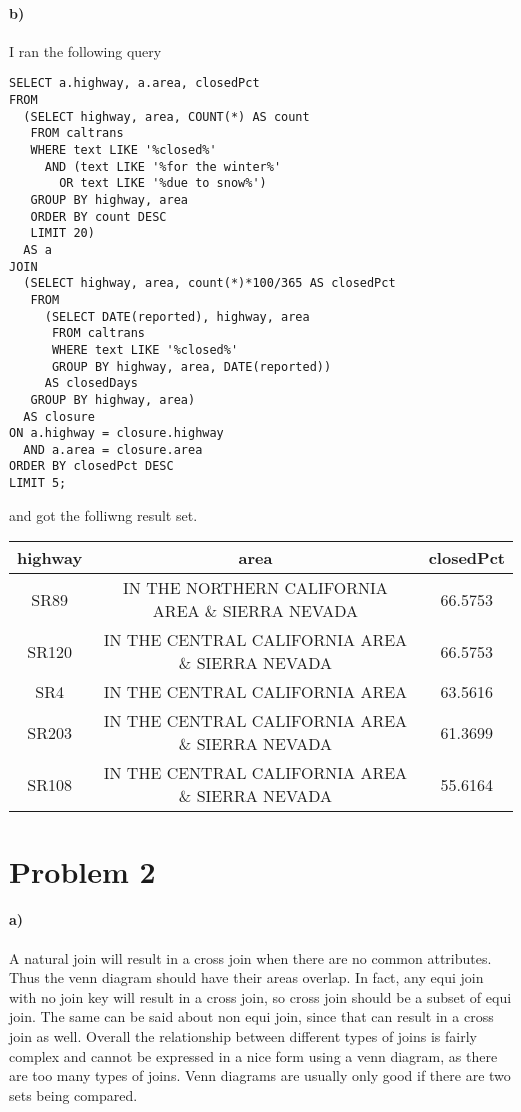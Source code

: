 \documentclass[12pt]{article}
\begin{document}
\paragraph{b)}

I ran the following query
\begin{verbatim}
SELECT a.highway, a.area, closedPct
FROM
  (SELECT highway, area, COUNT(*) AS count
   FROM caltrans
   WHERE text LIKE '%closed%'
     AND (text LIKE '%for the winter%'
       OR text LIKE '%due to snow%')
   GROUP BY highway, area
   ORDER BY count DESC
   LIMIT 20)
  AS a
JOIN
  (SELECT highway, area, count(*)*100/365 AS closedPct
   FROM
     (SELECT DATE(reported), highway, area
      FROM caltrans
      WHERE text LIKE '%closed%'
      GROUP BY highway, area, DATE(reported))
     AS closedDays
   GROUP BY highway, area)
  AS closure
ON a.highway = closure.highway
  AND a.area = closure.area
ORDER BY closedPct DESC
LIMIT 5;
\end{verbatim}
and got the folliwng result set.
\begin{center}
        \hspace*{-4cm}
        \begin{tabular}{c|c|c}
                highway & area & closedPct\\
                \hline
                SR89 & IN THE NORTHERN CALIFORNIA AREA \& SIERRA NEVADA & 66.5753\\
                SR120 & IN THE CENTRAL CALIFORNIA AREA \& SIERRA NEVADA & 66.5753\\
                SR4 & IN THE CENTRAL CALIFORNIA AREA & 63.5616\\
                SR203 & IN THE CENTRAL CALIFORNIA AREA \& SIERRA NEVADA & 61.3699\\
                SR108 & IN THE CENTRAL CALIFORNIA AREA \& SIERRA NEVADA & 55.6164
        \end{tabular}
        \hspace*{-4cm}
\end{center}

\section*{Problem 2}

\paragraph{a)}

A natural join will result in a cross join when there are no common attributes. Thus the venn diagram
should have their areas overlap. In fact, any equi join with no join key will result in a cross join,
so cross join should be a subset of equi join. The same can be said about non equi join, since that can
result in a cross join as well. Overall the relationship between different types of joins is fairly
complex and cannot be expressed in a nice form using a venn diagram, as there are too many types of joins.
Venn diagrams are usually only good if there are two sets being compared.
\end{document}
